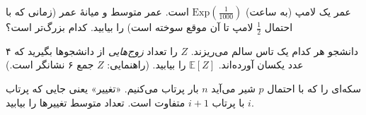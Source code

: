 \begin{exercise}
  عمر یک لامپ (به ساعت) $\mathrm{Exp}(\tfrac1{1000})$ است. عمر متوسط و میانهٔ عمر (زمانی که با احتمال $\tfrac12$ لامپ تا آن موقع سوخته است) را بیابید. کدام بزرگ‌تر است؟
\end{exercise}

\begin{exercise}
  ۴ دانشجو هر کدام یک تاس سالم می‌ریزند. $Z$ را تعداد \emph{زوج‌هایی} از دانشجوها بگیرید که عدد یکسان آورده‌اند. $\mathbb E[Z]$ را بیابید. (راهنمایی: $Z$ جمع ۶ نشانگر است.)
\end{exercise}

\begin{exercise}
  سکه‌ای را که با احتمال $p$ شیر می‌آید $n$ بار پرتاب می‌کنیم. «تغییر» یعنی جایی که پرتاب $i$ با پرتاب $i+1$ متفاوت است. تعداد متوسط تغییرها را بیابید.
\end{exercise}

